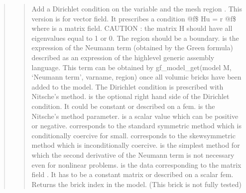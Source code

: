 \documentclass[a4paper,11pt,english]{sphinxmanual}
\begin{document}
\begin{quote}
\begin{quote}

Add a Dirichlet condition on the variable  and the mesh
region .
This version is for vector field. It prescribes a condition
@f\$ Hu = r @f\$ where  is a matrix field.
CAUTION : the matrix H should have all eigenvalues equal to 1 or 0.
The region should be a boundary.   
is the expression of the Neumann term (obtained by the Green formula)
described as an expression of the high\sphinxhyphen{}level
generic assembly language. This term can be obtained by
gf\_model\_get(model M, ‘Neumann term’, varname, region) once all volumic bricks have
been added to the model.  The Dirichlet
condition is prescribed with Nitsche’s method.  is the optional
right hand side of the Dirichlet condition. It could be constant or
described on a fem.  is the
Nitsche’s method parameter.  is a scalar value which can be
positive or negative.  corresponds to the standard symmetric
method which is conditionally coercive for   small.
 corresponds to the skew\sphinxhyphen{}symmetric method which is
inconditionally coercive.  is the simplest method
for which the second derivative of the Neumann term is not necessary
even for nonlinear problems.  is the data
corresponding to the matrix field . It has to be a constant matrix
or described on a scalar fem. Returns the brick index in the model.
(This brick is not fully tested)
\end{quote}

\begin{quote}


\end{quote}
\end{quote}
\end{document}
